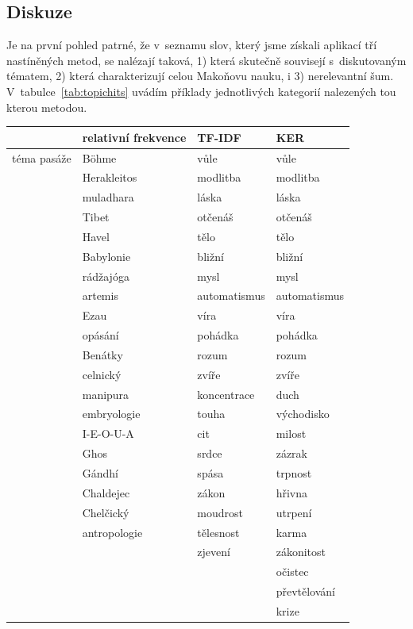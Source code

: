 \subsection{Diskuze}

Je na první pohled patrné, že v~seznamu slov, který jsme získali aplikací tří
nastíněných metod, se nalézají taková, 1) která skutečně souvisejí s~diskutovaným
tématem, 2) která charakterizují celou Makoňovu nauku, i 3) nerelevantní šum.
V~tabulce~\ref{tab:topichits} uvádím příklady jednotlivých kategorií nalezených
tou kterou metodou.

\begin{table}[htpb]
\begin{center}
\begin{tabular}{|l|l|l|l|}
\hline
	& relativní frekvence & TF-IDF	& KER \\
\hline
téma pasáže 	& Böhme 	& vůle	& vůle \\
	& Herakleitos	& modlitba	& modlitba \\
	& muladhara	& láska	& láska \\
	& Tibet	& otčenáš	& otčenáš \\
	& Havel	& tělo	& tělo \\
	& Babylonie	& bližní	& bližní \\
	& rádžajóga	& mysl	& mysl \\
	& artemis	& automatismus	& automatismus \\
	& Ezau	& víra	& víra \\
	& opásání	& pohádka	& pohádka \\
	& Benátky	& rozum	& rozum \\
	& celnický	& zvíře	& zvíře \\
	& manipura	& koncentrace	& duch \\
	& embryologie	& touha	& východisko \\
	& I-E-O-U-A	& cit	& milost \\
	& Ghos	& srdce	& zázrak \\
	& Gándhí	& spása	& trpnost \\
	& Chaldejec	& zákon	& hřivna \\
	& Chelčický	& moudrost	& utrpení \\
	& antropologie	& tělesnost	& karma \\
	& 	& zjevení	& zákonitost \\
	& 	& 	& očistec \\
	& 	& 	& převtělování \\
	& 	& 	& krize \\

\end{tabular}
\end{center}
\end{table}
